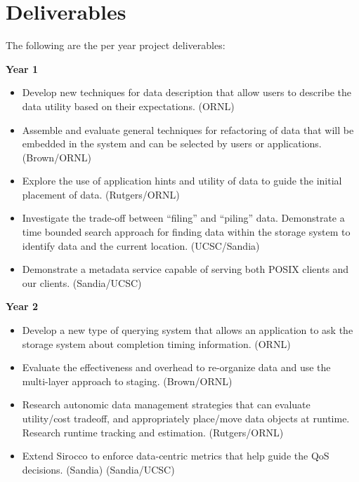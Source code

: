 \section{Deliverables}
The following are the per year project deliverables:

\textbf{Year 1}
\begin{itemize}
\item Develop new techniques for data description that allow users to 
describe the data utility based on their expectations. (ORNL)

\item Assemble and evaluate general techniques for refactoring of data
that will be embedded in the system and can be selected by users or applications. (Brown/ORNL)
\item Explore the use of application hints and utility of data to guide the initial placement of data. 
(Rutgers/ORNL)
\item Investigate the trade-off between ``filing'' and ``piling'' data. 
Demonstrate a time bounded search approach for finding data within the storage system
to identify data and the current location. (UCSC/Sandia)
\item Demonstrate a metadata service capable of serving both POSIX clients and our clients. (Sandia/UCSC)
\end{itemize}

\textbf{Year 2}
\begin{itemize}
\item Develop a new type of querying system that allows an application to ask the storage system
about completion timing information. (ORNL)
\item Evaluate the effectiveness and overhead to re-organize data and use the multi-layer approach 
to staging. (Brown/ORNL)
\item Research autonomic data management strategies that
can evaluate utility/cost tradeoff, and appropriately place/move data objects at runtime. 
Research runtime tracking and estimation. (Rutgers/ORNL)
\item Extend Sirocco to enforce data-centric metrics that help guide the QoS decisions. (Sandia)
(Sandia/UCSC)
\end{itemize}

